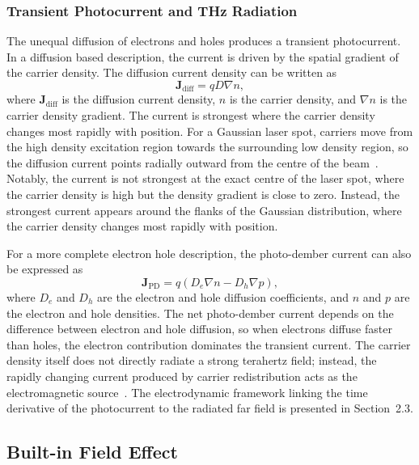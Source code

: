 \documentclass[12pt]{final_project_report}
\begin{document}
\subsubsection{Transient Photocurrent and THz Radiation}

The unequal diffusion of electrons and holes produces a transient photocurrent. In a diffusion based description, the current is driven by the spatial gradient of the carrier density. The diffusion current density can be written as
\begin{equation}
    \mathbf{J}_{\mathrm{diff}} = qD\nabla n,
    \label{eq:diffusion_current}
\end{equation}
where $\mathbf{J}_{\mathrm{diff}}$ is the diffusion current density, $n$ is the carrier density, and $\nabla n$ is the carrier density gradient. The current is strongest where the carrier density changes most rapidly with position. For a Gaussian laser spot, carriers move from the high density excitation region towards the surrounding low density region, so the diffusion current points radially outward from the centre of the beam~\cite{Tonouchi2020,NavarroCia2016}. Notably, the current is not strongest at the exact centre of the laser spot, where the carrier density is high but the density gradient is close to zero. Instead, the strongest current appears around the flanks of the Gaussian distribution, where the carrier density changes most rapidly with position.

For a more complete electron hole description, the photo-dember current can also be expressed as
\begin{equation}
    \mathbf{J}_{\mathrm{PD}} =
    q\left(D_e\nabla n - D_h\nabla p\right),
    \label{eq:photo_dember_current}
\end{equation}
where $D_e$ and $D_h$ are the electron and hole diffusion coefficients, and $n$ and $p$ are the electron and hole densities. The net photo-dember current depends on the difference between electron and hole diffusion, so when electrons diffuse faster than holes, the electron contribution dominates the transient current. The carrier density itself does not directly radiate a strong terahertz field; instead, the rapidly changing current produced by carrier redistribution acts as the electromagnetic source~\cite{Tonouchi2020,Pettine2023}. The electrodynamic framework linking the time derivative of the photocurrent to the radiated far field is presented in Section~2.3.

\subsection{Built-in Field Effect}
\end{document}
